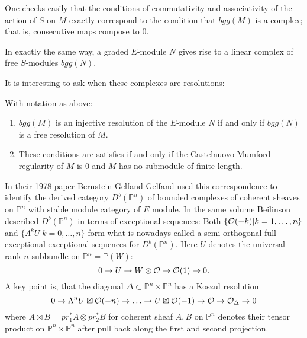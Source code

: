 \documentclass[twoside,12pt, leqno]{amsart}
\def\PP{{\mathbb P}}
\begin{document}
One checks easily that the conditions of commutativity and associativity of the action of $S$ on $M$ exactly correspond to the condition that $bgg(M)$ is a complex; that is, consecutive maps compose to 0.

In exactly the same way, a graded $E$-module $N$ gives rise to a linear  complex of free $S$-modules
$bgg(N)$.


It is interesting to ask when these complexes are resolutions:

\begin{theorem} With notation as above:
\begin{enumerate}
 \item $bgg(M)$ is an injective resolution of the $E$-module $N$ if and only if
$bgg(N)$ is a free resolution of $M$.

\item These conditions are satisfies if and only if the Castelnuovo-Mumford regularity of $M$ is 0 and $M$ has no submodule of finite length.
\end{enumerate}
\end{theorem}


In their 1978 paper Bernstein-Gelfand-Gelfand \cite{BGG} used this correspondence  to identify  the derived category $D^b(\PP^n)$ of bounded complexes of coherent sheaves on $\PP^n$ with stable module category of $E$ module. In the same volume Beilinson \cite{Bei} described
$D^b(\PP^n)$ in terms of exceptional sequences:
Both $\{ {\mathcal O}(-k) | k=1,\ldots,n\}$ and 
$\{ \Lambda^k U | k=0, \ldots, n\}$ form  what is nowadays called  a semi-orthogonal full exceptional exceptional sequences for $D^b(\PP^n)$.
Here $U$ denotes the universal rank $n$ subbundle on $\PP^n=\PP(W)$:
$$ 0 \to U \to W\otimes {\mathcal O} \to {\mathcal O}(1) \to 0.$$ 
A key point is, that the diagonal $\Delta \subset \PP^n \times \PP^n$ has a Koszul resolution
$$ 
0 \to \Lambda^n U \boxtimes {\mathcal O}(-n) \to \ldots \to U \boxtimes {\mathcal O}(-1) \to {\mathcal O} \to {\mathcal O}_\Delta \to 0
$$
where $A \boxtimes B = pr_1^* A \otimes pr_2^* B$ for  coherent sheaf $A,B$ on $\PP^n$ denotes their tensor product on $\PP^n \times \PP^n$ after pull back along the first and second projection.
\end{document}
